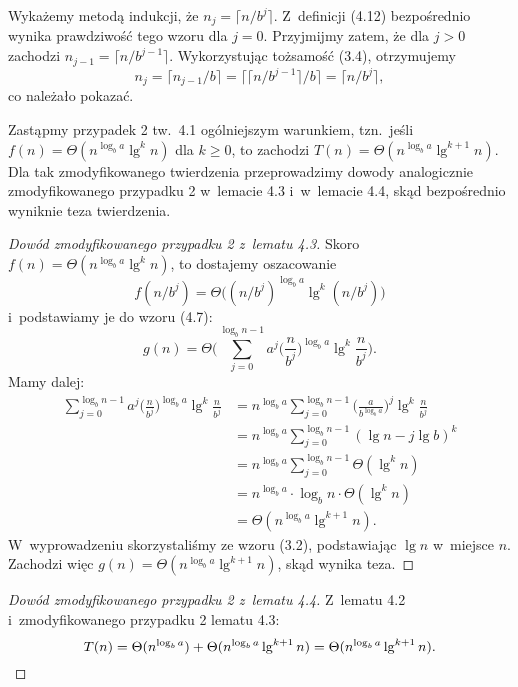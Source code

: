 
\exercise %
Wykażemy metodą indukcji, że $n_j=\bigl\lceil n/b^j\bigr\rceil$.
Z~definicji (4.12) bezpośrednio wynika prawdziwość tego wzoru dla $j=0$.
Przyjmijmy zatem, że dla $j>0$ zachodzi $n_{j-1}=\bigl\lceil n/b^{j-1}\bigr\rceil$.
Wykorzystując tożsamość (3.4), otrzymujemy
\[
	n_j = \lceil n_{j-1}/b\rceil = \bigl\lceil\bigl\lceil n/b^{j-1}\bigr\rceil/b\bigr\rceil = \bigl\lceil n/b^j\bigr\rceil,
\]
co należało pokazać.

\exercise %
Zastąpmy przypadek 2 tw.\ 4.1 ogólniejszym warunkiem, tzn.\ jeśli $f(n)=\Theta(n^{\log_ba}\lg^kn)$ dla $k\ge0$, to zachodzi $T(n)=\Theta(n^{\log_ba}\lg^{k+1}n)$.
Dla tak zmodyfikowanego twierdzenia przeprowadzimy dowody analogicznie zmodyfikowanego przypadku 2 w~lemacie 4.3 i~w~lemacie 4.4, skąd bezpośrednio wyniknie teza twierdzenia.

\begin{proof}[Dowód zmodyfikowanego przypadku 2 z~lematu 4.3]
	Skoro $f(n)=\Theta(n^{\log_ba}\lg^kn)$, to dostajemy oszacowanie
	\[
		f(n/b^j)=\Theta\bigl((n/b^j)^{\log_ba}\lg^k(n/b^j)\bigr)
	\]
	i~podstawiamy je do wzoru (4.7):
	\[
		g(n) = \Theta\biggl(\sum_{j=0}^{\log_bn-1}a^j\biggl(\frac{n}{b^j}\biggr)^{\log_ba}\lg^k\frac{n}{b^j}\biggr).
	\]
	Mamy dalej:
	\begin{align*}
		\sum_{j=0}^{\log_bn-1}a^j\biggl(\frac{n}{b^j}\biggr)^{\log_ba}\lg^k\frac{n}{b^j} &= n^{\log_ba}\sum_{j=0}^{\log_bn-1}\biggl(\frac{a}{b^{\log_ba}}\biggr)^j\lg^k\frac{n}{b^j} \\
		&= n^{\log_ba}\sum_{j=0}^{\log_bn-1}(\lg n-j\lg b)^k \\
		&= n^{\log_ba}\sum_{j=0}^{\log_bn-1}\Theta(\lg^kn) \\
		&= n^{\log_ba}\cdot\log_bn\cdot\Theta(\lg^kn) \\[1mm]
		&= \Theta(n^{\log_ba}\lg^{k+1}n).
	\end{align*}
	W~wyprowadzeniu skorzystaliśmy ze wzoru (3.2), podstawiając $\lg n$ w~miejsce $n$.
	Zachodzi więc $g(n)=\Theta(n^{\log_ba}\lg^{k+1}n)$, skąd wynika teza.
\end{proof}

\begin{proof}[Dowód zmodyfikowanego przypadku 2 z~lematu 4.4]
	Z~lematu 4.2 i~zmodyfikowanego przypadku 2 lematu 4.3:
	\[
		T(n) = \Theta(n^{\log_ba})+\Theta(n^{\log_ba}\lg^{k+1}n) = \Theta(n^{\log_ba}\lg^{k+1}n). \qedhere
	\]
\end{proof}

